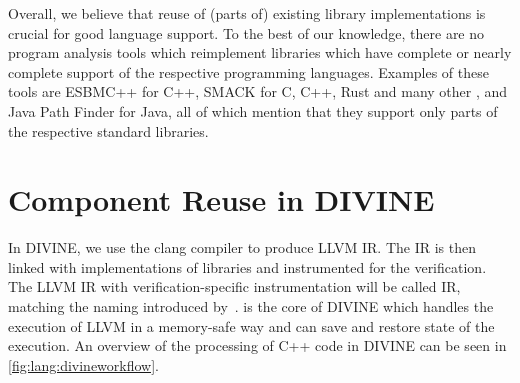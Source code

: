 Overall, we believe that reuse of (parts of) existing library implementations is crucial for good language support.
To the best of our knowledge, there are no program analysis tools which reimplement libraries which have complete or nearly complete support of the
respective programming languages.
Examples of these tools are ESBMC++  for C++, SMACK for C, C++, Rust and many other , and Java Path Finder  for Java, all of which mention that they support only parts of the respective standard libraries.

\section{Component Reuse in DIVINE}\label{sec:lang:divine}

In DIVINE, we use the clang compiler to produce LLVM IR.
The IR is then linked with implementations of libraries and instrumented for the verification.
The LLVM IR with verification-specific instrumentation will be called \divm IR,
matching the naming introduced by~.
\divm is the core of DIVINE which handles the execution of LLVM in a memory-safe
way and can save and restore state of the execution.
An overview of the processing of C++ code in DIVINE can be seen in \autoref{fig:lang:divineworkflow}.

